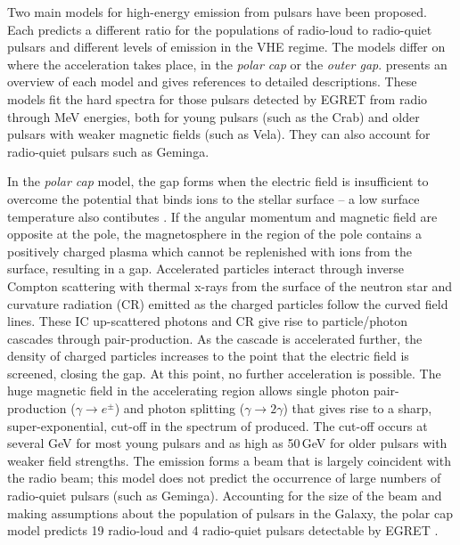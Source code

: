 Two main models for high-energy \Gray emission from pulsars have been
proposed. Each predicts a different ratio for the populations of
radio-loud to radio-quiet pulsars and different levels of emission in
the VHE \Gray regime. The models differ on where the acceleration
takes place, in the \textit{polar cap} or the \textit{outer gap}.
\citet{REF::HARDING::HEGRA2001} presents an overview of each model and
gives references to detailed descriptions. These models fit the hard
spectra for those pulsars detected by EGRET from radio through MeV
energies, both for young pulsars (such as the Crab) and older pulsars
with weaker magnetic fields (such as Vela). They can also account for
radio-quiet pulsars such as Geminga.

In the \textit{polar cap} model, the gap forms when the electric field
is insufficient to overcome the potential that binds ions to the
stellar surface -- a low surface temperature also contibutes
\citep{REF::RUDERMAN_SUTHERLAND::APJ1975}. If the angular momentum and
magnetic field are opposite at the pole, the magnetosphere in the
region of the pole contains a positively charged plasma which cannot
be replenished with ions from the surface, resulting in a
gap. Accelerated particles interact through inverse Compton scattering
with thermal x-rays from the surface of the neutron star and curvature
radiation (CR) emitted as the charged particles follow the curved
field lines. These IC up-scattered photons and CR give rise to
particle/photon cascades through pair-production. As the cascade is
accelerated further, the density of charged particles increases to the
point that the electric field is screened, closing the gap. At this
point, no further acceleration is possible. The huge magnetic field in
the accelerating region allows single photon pair-production
($\gamma\rightarrow e^\pm$) and photon splitting ($\gamma\rightarrow
2\gamma$) that gives rise to a sharp, super-exponential, cut-off in
the spectrum of \Grays produced. The cut-off occurs at several GeV for
most young pulsars and as high as 50\,GeV for older pulsars with
weaker field strengths. The \Gray emission forms a beam that is
largely coincident with the radio beam; this model does not predict
the occurrence of large numbers of radio-quiet pulsars (such as
Geminga). Accounting for the size of the beam and making assumptions
about the population of pulsars in the Galaxy, the polar cap model
predicts 19 radio-loud and 4 radio-quiet pulsars detectable by EGRET
\citep{REF::HARDING::SSRNS2003}.

